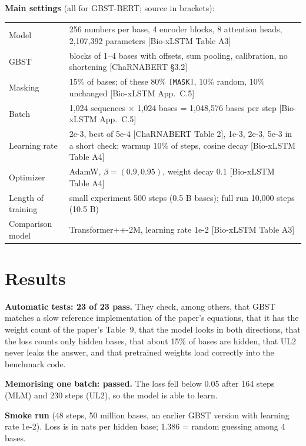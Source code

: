 \documentclass[11pt,a4paper]{article}
\newcommand{\code}[1]{\texttt{\small #1}}
\begin{document}
\textbf{Main settings} (all for GBST-BERT; source in brackets):
\begin{center}\small
\begin{tabularx}{0.95\linewidth}{lL}
\toprule
Model & 256 numbers per base, 4 encoder blocks, 8 attention heads, 2,107,392 parameters [Bio-xLSTM Table A3] \\
GBST & blocks of 1--4 bases with offsets, sum pooling, calibration, no shortening [ChaRNABERT \S3.2] \\
Masking & 15\% of bases; of these 80\% \code{[MASK]}, 10\% random, 10\% unchanged [Bio-xLSTM App.~C.5] \\
Batch & 1,024 sequences $\times$ 1,024 bases = 1,048,576 bases per step [Bio-xLSTM App.~C.5] \\
Learning rate & 2e-3, best of 5e-4 [ChaRNABERT Table 2], 1e-3, 2e-3, 5e-3 in a short check; warmup 10\% of steps, cosine decay [Bio-xLSTM Table A4] \\
Optimizer & AdamW, $\beta=(0.9, 0.95)$, weight decay 0.1 [Bio-xLSTM Table A4] \\
Length of training & small experiment 500 steps (0.5 B bases); full run 10,000 steps (10.5 B) \\
Comparison model & Transformer++-2M, learning rate 1e-2 [Bio-xLSTM Table A3] \\
\bottomrule
\end{tabularx}
\end{center}

\section{Results}
\label{sec:results}

\textbf{Automatic tests: 23 of 23 pass.} They check, among others, that GBST matches a slow
reference implementation of the paper's equations, that it has the weight count of the paper's
Table~9, that the model looks in both directions, that the loss counts only hidden bases, that
about 15\% of bases are hidden, that UL2 never leaks the answer, and that pretrained weights load
correctly into the benchmark code.

\textbf{Memorising one batch: passed.} The loss fell below 0.05 after 164 steps (MLM) and 230
steps (UL2), so the model is able to learn.

\textbf{Smoke run} (48 steps, 50 million bases, an earlier GBST version with learning rate 1e-2).
Loss is in nats per hidden base; 1.386 = random guessing among 4 bases.
\end{document}

